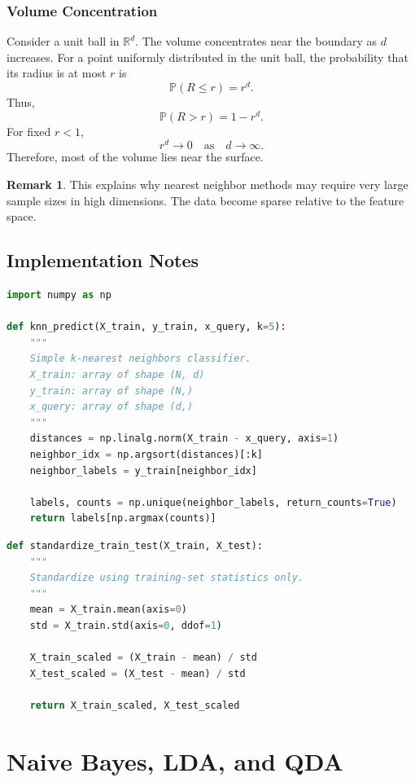 \documentclass[12pt,oneside]{book}
\numberwithin{equation}{section}
\theoremstyle{definition}
\newtheorem{remark}{Remark}[section]
\theoremstyle{plain}
\theoremstyle{remark}
\newcommand{\R}{\mathbb{R}}
\newcommand{\Prob}{\mathbb{P}}
\begin{document}
\subsection{Volume Concentration}

Consider a unit ball in $\R^d$. The volume concentrates near the boundary as $d$ increases. For a point uniformly distributed in the unit ball, the probability that its radius is at most $r$ is
\[
\Prob(R\leq r)=r^d.
\]
Thus,
\[
\Prob(R>r)=1-r^d.
\]
For fixed $r<1$,
\[
r^d \to 0
\quad
\text{as}
\quad
d\to\infty.
\]
Therefore, most of the volume lies near the surface.

\begin{remark}
This explains why nearest neighbor methods may require very large sample sizes in high dimensions. The data become sparse relative to the feature space.
\end{remark}

\section{Implementation Notes}

\begin{lstlisting}[language=Python]
import numpy as np

def knn_predict(X_train, y_train, x_query, k=5):
    """
    Simple k-nearest neighbors classifier.
    X_train: array of shape (N, d)
    y_train: array of shape (N,)
    x_query: array of shape (d,)
    """
    distances = np.linalg.norm(X_train - x_query, axis=1)
    neighbor_idx = np.argsort(distances)[:k]
    neighbor_labels = y_train[neighbor_idx]

    labels, counts = np.unique(neighbor_labels, return_counts=True)
    return labels[np.argmax(counts)]
\end{lstlisting}

\begin{lstlisting}[language=Python]
def standardize_train_test(X_train, X_test):
    """
    Standardize using training-set statistics only.
    """
    mean = X_train.mean(axis=0)
    std = X_train.std(axis=0, ddof=1)

    X_train_scaled = (X_train - mean) / std
    X_test_scaled = (X_test - mean) / std

    return X_train_scaled, X_test_scaled
\end{lstlisting}

\chapter{Naive Bayes, LDA, and QDA}
\end{document}
